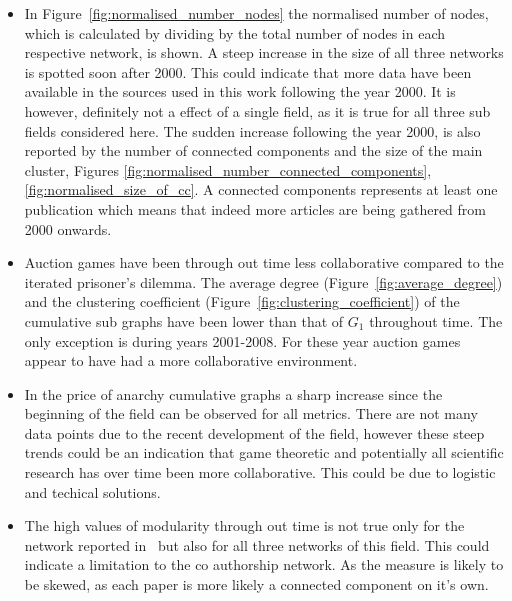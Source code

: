 \documentclass{article}
\theoremstyle{definition}
\begin{document}
\begin{itemize}
    \item In Figure~\ref{fig:normalised_number_nodes} the normalised number of nodes,
    which is calculated by dividing by the total number of nodes in each respective network,
    is shown. A steep increase in the size of all three networks is spotted soon after
    2000. This could indicate that more data have been available in the sources
    used in this work following the year 2000. It is however, definitely not a effect
    of a single field, as it is true for all three sub fields considered here.
    The sudden increase following the year 2000, is also reported by the
    number of connected components and the size of the main cluster, Figures
    \ref{fig:normalised_number_connected_components}, \ref{fig:normalised_size_of_cc}.
    A connected components represents at least one publication which means that indeed
    more articles are being gathered from 2000 onwards.
    \item Auction games have been through out time less collaborative compared
    to the iterated prisoner's dilemma. The average degree (Figure~\ref{fig:average_degree})
    and the clustering coefficient (Figure~\ref{fig:clustering_coefficient}) of 
    the cumulative sub graphs have been lower than that of \(G_1\) throughout
    time. The only exception is during years 2001-2008. For these
    year auction games appear to have had a more collaborative environment.
    \item In the price of anarchy cumulative graphs a sharp increase since the 
    beginning of the field can be observed for all metrics. There are not
    many data points due to the recent development of the field, however
    these steep trends could be an indication that game theoretic and potentially
    all scientific research has over time been more collaborative. This could
    be due to logistic and techical solutions.
    \item The high values of modularity through out time is not true only for the
    network reported in~\cite{Liu2015} but also for all three networks of this
    field. This could indicate a limitation to the co authorship network. As the
    measure is likely to be skewed, as each paper is more likely a connected
    component on it's own.
\end{itemize}
\end{document}
